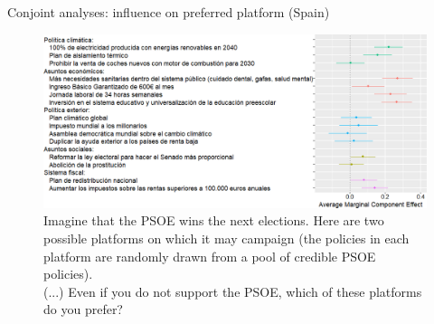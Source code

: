 \documentclass[aspectratio=169,xcolor=dvipsnames, 11pt,mathserif]{beamer}
\begin{document}
\begin{framefont}{\small}
\begin{frame}{Conjoint analyses: influence on preferred platform (Spain) \hyperlink{conjoint_r_uk}{}\label{conjoint_r_es}} 
    \bbvs \ip {}
    \ee
    \begin{figure}\vspace{-.4cm}
        \centering 
        \caption{Imagine that the PSOE wins the next elections. Here are two possible platforms on which it may campaign (the policies in each platform are randomly drawn from a pool of credible PSOE policies).\\
		(...) Even if you do not support the PSOE, which of these platforms do you prefer? }
        \vspace{-.2cm} 
        \includegraphics[height=.7\textheight]{../figures/ES/ca_r.png} 
    \end{figure}
\end{frame}


\end{framefont}
\end{document}

